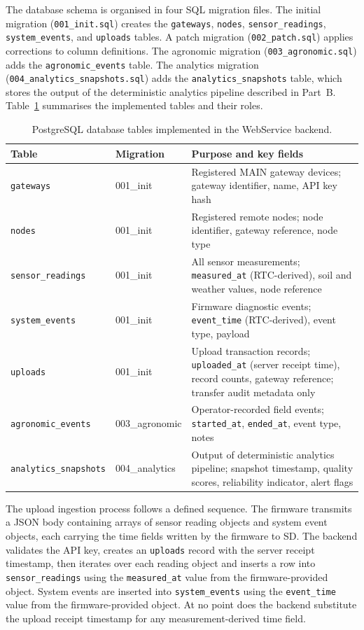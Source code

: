The database schema is organised in four SQL migration files. The initial migration (\texttt{001\_init.sql}) creates the \texttt{gateways}, \texttt{nodes}, \texttt{sensor\_readings}, \texttt{system\_events}, and \texttt{uploads} tables. A patch migration (\texttt{002\_patch.sql}) applies corrections to column definitions. The agronomic migration (\texttt{003\_agronomic.sql}) adds the \texttt{agronomic\_events} table. The analytics migration (\texttt{004\_analytics\_snapshots.sql}) adds the \texttt{analytics\_snapshots} table, which stores the output of the deterministic analytics pipeline described in Part~B. Table~\ref{tab:database-tables} summarises the implemented tables and their roles.

\begin{table}[H]
\centering
\caption{PostgreSQL database tables implemented in the WebService backend.}
\label{tab:database-tables}
\small
\begin{tabular}{p{3.8cm} p{2.5cm} p{7.0cm}}
\hline
\textbf{Table} & \textbf{Migration} & \textbf{Purpose and key fields} \\
\hline
\texttt{gateways} & 001\_init & Registered MAIN gateway devices; gateway identifier, name, API key hash \\
\hline
\texttt{nodes} & 001\_init & Registered remote nodes; node identifier, gateway reference, node type \\
\hline
\texttt{sensor\_readings} & 001\_init & All sensor measurements; \texttt{measured\_at} (RTC-derived), soil and weather values, node reference \\
\hline
\texttt{system\_events} & 001\_init & Firmware diagnostic events; \texttt{event\_time} (RTC-derived), event type, payload \\
\hline
\texttt{uploads} & 001\_init & Upload transaction records; \texttt{uploaded\_at} (server receipt time), record counts, gateway reference; transfer audit metadata only \\
\hline
\texttt{agronomic\_events} & 003\_agronomic & Operator-recorded field events; \texttt{started\_at}, \texttt{ended\_at}, event type, notes \\
\hline
\texttt{analytics\_snapshots} & 004\_analytics & Output of deterministic analytics pipeline; snapshot timestamp, quality scores, reliability indicator, alert flags \\
\hline
\end{tabular}
\end{table}

The upload ingestion process follows a defined sequence. The firmware transmits a JSON body containing arrays of sensor reading objects and system event objects, each carrying the time fields written by the firmware to SD. The backend validates the API key, creates an \texttt{uploads} record with the server receipt timestamp, then iterates over each reading object and inserts a row into \texttt{sensor\_readings} using the \texttt{measured\_at} value from the firmware-provided object. System events are inserted into \texttt{system\_events} using the \texttt{event\_time} value from the firmware-provided object. At no point does the backend substitute the upload receipt timestamp for any measurement-derived time field.

